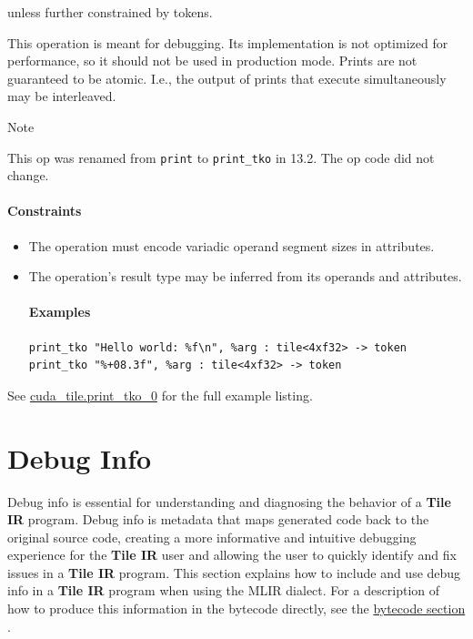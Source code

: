 \documentclass{article}
\begin{document}
unless further constrained by tokens.


This operation is meant for debugging. Its implementation is not optimized for performance, so it should not be used in production mode. Prints are not guaranteed to be atomic. I.e., the output of prints that execute simultaneously may be interleaved.


Note


This op was renamed from \texttt{print} to \texttt{print\_tko} in 13.2. The op code did not change.



\paragraph{Constraints}

\begin{itemize}
\item The operation must encode variadic operand segment sizes in attributes.
\item The operation's result type may be inferred from its operands and attributes.


\paragraph{Examples}

\begin{lstlisting}
print_tko "Hello world: %f\n", %arg : tile<4xf32> -> token
print_tko "%+08.3f", %arg : tile<4xf32> -> token
\end{lstlisting}

\end{itemize}
See \href{https://docs.nvidia.com/cuda/tile-ir/latest/sections/appendix.html#example-cuda-tile-print-tko-0}{cuda\_tile.print\_tko\_0} for the full example listing.


\newpage
\section{Debug Info}

Debug info is essential for understanding and diagnosing the behavior of a \textbf{Tile IR} program. Debug info is metadata that maps generated code back to the original source code, creating a more informative and intuitive debugging experience for the \textbf{Tile IR} user and allowing the user to quickly identify and fix issues in a \textbf{Tile IR} program. This section explains how to include and use debug info in a \textbf{Tile IR} program when using the MLIR dialect. For a description of how to produce this information in the bytecode directly, see the \href{https://docs.nvidia.com/cuda/tile-ir/latest/sections/bytecode.html#section-bytecode}{bytecode section} .
\end{document}
